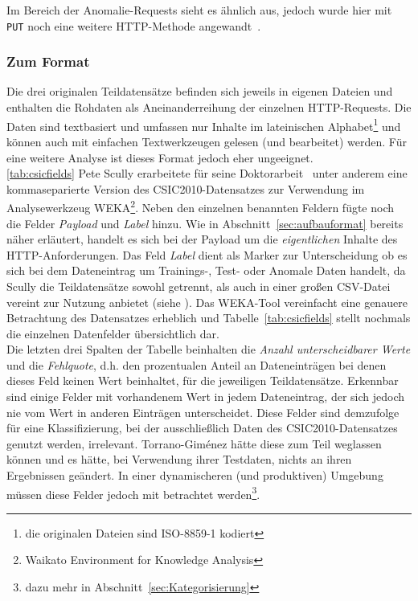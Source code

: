 

Im Bereich der Anomalie-Requests sieht es ähnlich aus, jedoch wurde hier mit \verb=PUT= noch eine weitere HTTP-Methode angewandt~\cite{csic2010}. 

\subsubsection{Zum Format}
Die drei originalen Teildatensätze befinden sich jeweils in eigenen Dateien und enthalten die Rohdaten als Aneinanderreihung der einzelnen HTTP-Requests. Die Daten sind textbasiert und umfassen nur Inhalte im lateinischen Alphabet\footnote{die originalen Dateien sind ISO-8859-1 kodiert} und können auch mit einfachen Textwerkzeugen gelesen (und bearbeitet) werden. Für eine weitere Analyse ist dieses Format jedoch eher ungeeignet.\\ \ref{tab:csicfields}     Pete Scully erarbeitete für seine Doktorarbeit~\cite{Scully2016} unter anderem eine kommaseparierte Version des CSIC2010-Datensatzes zur Verwendung im  Analysewerkzeug WEKA\footnote{Waikato Environment for Knowledge Analysis}. Neben den einzelnen benannten Feldern fügte noch die Felder \emph{Payload} und \emph{Label} hinzu. Wie in Abschnitt~\ref{sec:aufbauformat} bereits näher erläutert, handelt es sich bei der Payload um die \emph{eigentlichen} Inhalte des HTTP-Anforderungen. Das Feld \emph{Label} dient als Marker zur Unterscheidung ob es sich bei dem Dateneintrag um Trainings-, Test- oder Anomale Daten handelt, da Scully die Teildatensätze sowohl getrennt, als auch in einer großen CSV-Datei vereint zur Nutzung anbietet (siehe \cite{csiccsv2010}). Das WEKA-Tool vereinfacht eine genauere Betrachtung des Datensatzes erheblich und Tabelle~\ref{tab:csicfields} stellt nochmals die einzelnen Datenfelder übersichtlich dar.\\

Die letzten drei Spalten der Tabelle beinhalten die \emph{Anzahl unterscheidbarer Werte} und die \emph{Fehlquote}, d.h. den prozentualen Anteil an Dateneinträgen bei denen dieses Feld keinen Wert beinhaltet, für die jeweiligen Teildatensätze. Erkennbar sind einige Felder mit vorhandenem Wert in jedem Dateneintrag, der sich jedoch nie vom Wert in anderen Einträgen unterscheidet. Diese Felder sind demzufolge für eine Klassifizierung, bei der ausschließlich Daten des CSIC2010-Datensatzes genutzt werden, irrelevant. Torrano-Giménez hätte diese zum Teil weglassen können und es hätte, bei Verwendung ihrer Testdaten, nichts an ihren Ergebnissen geändert. In einer dynamischeren (und produktiven) Umgebung müssen diese Felder jedoch mit betrachtet werden\footnote{dazu mehr in Abschnitt~\ref{sec:Kategorisierung}}.\\

